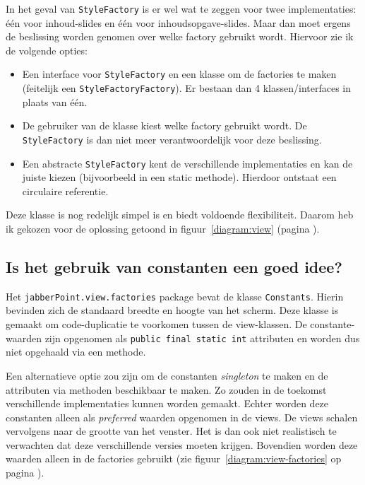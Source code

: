 \documentclass[a4paper]{article}
\newcommand{\question}[1]{
  \subsection{#1}
}
\newcommand{\code}[1]{\lstinline[columns=fixed]{#1}}
\begin{document}
		In het geval van \code{StyleFactory} is er wel wat te zeggen voor twee implementaties: één voor inhoud-slides en één voor inhoudsopgave-slides.
		Maar dan moet ergens de beslissing worden genomen over welke factory gebruikt wordt.
		Hiervoor zie ik de volgende opties:
		\begin{itemize}
			\item Een interface voor \code{StyleFactory} en een klasse om de factories te maken (feitelijk een \code{StyleFactoryFactory}).
				Er bestaan dan 4 klassen/interfaces in plaats van één.
			\item De gebruiker van de klasse kiest welke factory gebruikt wordt.
				De \code{Style}\-\code{Factory} is dan niet meer verantwoordelijk voor deze beslissing.
			\item Een abstracte \code{StyleFactory} kent de verschillende implementaties en kan de juiste kiezen (bijvoorbeeld in een static methode).
				Hierdoor ontstaat een circulaire referentie.
		\end{itemize}
		Deze klasse is nog redelijk simpel is en biedt voldoende flexibiliteit.
		Daarom heb ik gekozen voor de oplossing getoond in figuur~\ref{diagram:view} (pagina \pageref{diagram:view}).

	\question{Is het gebruik van constanten een goed idee?}
		Het \code{jabberPoint.view.factories} package bevat de klasse \code{Constants}.
		Hierin bevinden zich de standaard breedte en hoogte van het scherm.
		Deze klasse is gemaakt om code-duplicatie te voorkomen tussen de view-klassen.
		De constante-waarden zijn opgenomen als \code{public final static int} attributen en worden dus niet opgehaald via een methode.

		Een alternatieve optie zou zijn om de constanten \textit{singleton} te maken en de attributen via methoden beschikbaar te maken.
		Zo zouden in de toekomst verschillende implementaties kunnen worden gemaakt.
		Echter worden deze constanten alleen als \textit{preferred} waarden opgenomen in de views.
		De views schalen vervolgens naar de grootte van het venster.
		Het is dan ook niet realistisch te verwachten dat deze verschillende versies moeten krijgen.
		Bovendien worden deze waarden alleen in de factories gebruikt (zie figuur~\ref{diagram:view-factories} op pagina \pageref{diagram:view-factories}).
\end{document}
